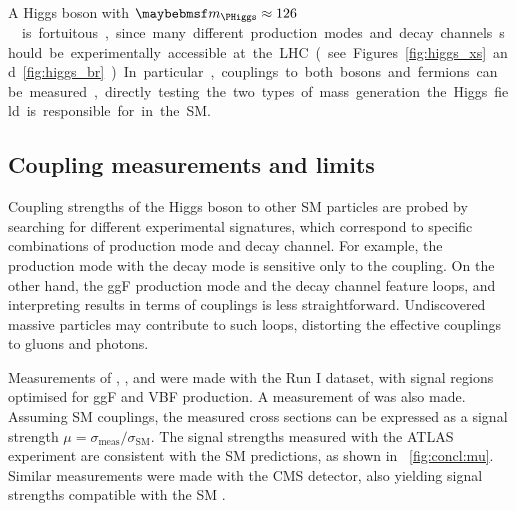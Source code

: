 A Higgs boson with \unit{$\mH \approx 126$}{\GeV} is fortuitous, 
since many different production modes and decay channels should be experimentally 
accessible at the LHC (see Figures~\ref{fig:higgs_xs} and \ref{fig:higgs_br}). In 
particular, couplings to both bosons and fermions can be measured, directly testing the 
two types of mass generation the Higgs field is responsible for in the SM.



\subsection{Coupling measurements and limits}
\label{sec:searches:couplings}

Coupling strengths of the Higgs boson to other SM particles are probed by searching for 
different experimental signatures, which correspond to specific combinations of 
production mode and decay channel. For example, the \WH production mode with the \HWW 
decay mode is sensitive only to the \HepProcess{\PHiggs\PW\PW} coupling. On the other 
hand, the ggF production mode and the \HepProcess{\PHiggs \HepTo \Pphoton\Pphoton} decay 
channel feature loops, and interpreting results in terms of couplings is less 
straightforward. Undiscovered massive particles may contribute to such loops, distorting 
the effective couplings to gluons and photons.

Measurements of \HepProcess{\PHiggs \HepTo \Pphoton\Pphoton}, \HepProcess{\PHiggs \HepTo 
\PZ\PZ}, \HWW and \HepProcess{\PHiggs \HepTo \Ptau\Ptau} were made with the Run I 
dataset, with signal regions optimised for ggF and VBF production. A measurement of 
\HepProcess{\PV\PHiggs \HepTo \PV\Pbottom\APbottom} was also made. Assuming SM couplings, 
the measured cross sections can be expressed as a signal strength $\mu = 
\sigma_{\text{meas}} / \sigma_{\text{SM}}$. The signal strengths measured with the ATLAS 
experiment are consistent with the SM predictions, as shown in \Figure~\ref{fig:concl:mu}.
Similar measurements were made with the CMS detector, also yielding signal strengths 
compatible with the SM \cite{CMS:Hgamgam,CMS:HZZ,CMS:HWW,CMS:Htautau,CMS:Hbb}.

